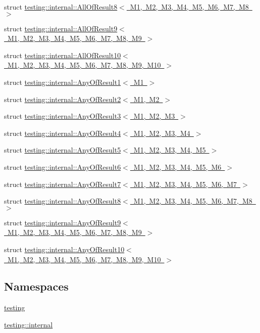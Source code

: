 \begin{DoxyCompactItemize}
struct \mbox{\hyperlink{structtesting_1_1internal_1_1AllOfResult8}{testing\+::internal\+::\+All\+Of\+Result8$<$ M1, M2, M3, M4, M5, M6, M7, M8 $>$}}
\item 
struct \mbox{\hyperlink{structtesting_1_1internal_1_1AllOfResult9}{testing\+::internal\+::\+All\+Of\+Result9$<$ M1, M2, M3, M4, M5, M6, M7, M8, M9 $>$}}
\item 
struct \mbox{\hyperlink{structtesting_1_1internal_1_1AllOfResult10}{testing\+::internal\+::\+All\+Of\+Result10$<$ M1, M2, M3, M4, M5, M6, M7, M8, M9, M10 $>$}}
\item 
struct \mbox{\hyperlink{structtesting_1_1internal_1_1AnyOfResult1}{testing\+::internal\+::\+Any\+Of\+Result1$<$ M1 $>$}}
\item 
struct \mbox{\hyperlink{structtesting_1_1internal_1_1AnyOfResult2}{testing\+::internal\+::\+Any\+Of\+Result2$<$ M1, M2 $>$}}
\item 
struct \mbox{\hyperlink{structtesting_1_1internal_1_1AnyOfResult3}{testing\+::internal\+::\+Any\+Of\+Result3$<$ M1, M2, M3 $>$}}
\item 
struct \mbox{\hyperlink{structtesting_1_1internal_1_1AnyOfResult4}{testing\+::internal\+::\+Any\+Of\+Result4$<$ M1, M2, M3, M4 $>$}}
\item 
struct \mbox{\hyperlink{structtesting_1_1internal_1_1AnyOfResult5}{testing\+::internal\+::\+Any\+Of\+Result5$<$ M1, M2, M3, M4, M5 $>$}}
\item 
struct \mbox{\hyperlink{structtesting_1_1internal_1_1AnyOfResult6}{testing\+::internal\+::\+Any\+Of\+Result6$<$ M1, M2, M3, M4, M5, M6 $>$}}
\item 
struct \mbox{\hyperlink{structtesting_1_1internal_1_1AnyOfResult7}{testing\+::internal\+::\+Any\+Of\+Result7$<$ M1, M2, M3, M4, M5, M6, M7 $>$}}
\item 
struct \mbox{\hyperlink{structtesting_1_1internal_1_1AnyOfResult8}{testing\+::internal\+::\+Any\+Of\+Result8$<$ M1, M2, M3, M4, M5, M6, M7, M8 $>$}}
\item 
struct \mbox{\hyperlink{structtesting_1_1internal_1_1AnyOfResult9}{testing\+::internal\+::\+Any\+Of\+Result9$<$ M1, M2, M3, M4, M5, M6, M7, M8, M9 $>$}}
\item 
struct \mbox{\hyperlink{structtesting_1_1internal_1_1AnyOfResult10}{testing\+::internal\+::\+Any\+Of\+Result10$<$ M1, M2, M3, M4, M5, M6, M7, M8, M9, M10 $>$}}
\end{DoxyCompactItemize}
\subsection*{Namespaces}
\begin{DoxyCompactItemize}
\item 
 \mbox{\hyperlink{namespacetesting}{testing}}
\item 
 \mbox{\hyperlink{namespacetesting_1_1internal}{testing\+::internal}}
\end{DoxyCompactItemize}
